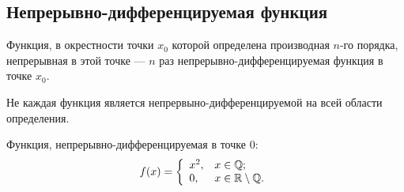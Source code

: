 \subsection{Непрерывно-дифференцируемая функция}
\begin{definition} 
Функция, в окрестности точки \( x_0 \) которой определена производная \( n \)-го порядка, непрерывная в этой точке --- \( n \) раз непрерывно-дифференцируемая функция в точке \( x_0 \).
\end{definition}
Не каждая функция является непрервыно-дифференцируемой на всей области определения.
\begin{example} Функция, непрерывно-дифференцируемая в точке \( 0 \): 
\[ 
    f(x) = \left\{ \begin{array}{ll}
        x^2, & x \in \mathbb{Q}; \\
        0,   & x \in \mathbb{R} \setminus \mathbb{Q}.
    \end{array} \right.
\]
\end{example}
